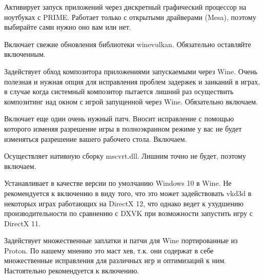 \documentclass[letterpaper,10pt,russian,openany]{sphinxmanual}
\begin{document}
\sphinxAtStartPar
{} \sphinxhyphen{} Активирует запуск приложений через дискретный графический процессор на ноутбуках с PRIME.
Работает только с открытыми драйверами (Mesa), поэтому выбирайте сами нужно оно вам или нет.

\sphinxAtStartPar
{} \sphinxhyphen{} Включает свежие обновления библиотеки winevulkan. Обязательно оставляйте включенным.

\sphinxAtStartPar
{} \sphinxhyphen{} Задействует обход композитора приложениями запускаемыми через Wine.
Очень полезная и нужная опция для исправления проблем задержек и заиканий в играх,
в случае когда системный композитор пытается лишний раз осуществить композитинг над окном с игрой запущенной через Wine.
Обязательно включаем.

\sphinxAtStartPar
{} \sphinxhyphen{} Включает еще один очень нужный патч.
Вносит исправление  с помощью которого изменяя разрешение игры в полноэкранном режиме у вас не будет изменяться разрешение вашего рабочего стола. Включаем.

\sphinxAtStartPar
{} \sphinxhyphen{} Осуществляет нативную сборку mscvrt.dll. Лишним точно не будет, поэтому включаем.

\sphinxAtStartPar
{} \sphinxhyphen{} Устанавливает в качестве версии по умолчанию Windows 10 в Wine.
Не рекомендуется к включению в виду того, что это может задействовать vkd3d в некоторых играх работающих на DirectX 12,
что однако ведет к ухудшению производительности по сравнению с DXVK при возможности запустить игру с DirectX 11.

\sphinxAtStartPar
{} \sphinxhyphen{} Задействует множественные заплатки и патчи для Wine портированные из Proton.
По нашему мнению это маст хев, т.к. они содержат в себе множественные исправления для различных игр и оптимизаций к ним.
Настоятельно рекомендуется к включению.
\end{document}
